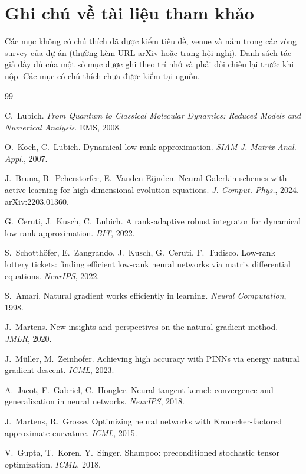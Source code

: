 \section*{Ghi chú về tài liệu tham khảo}
Các mục không có chú thích đã được kiểm tiêu đề, venue và năm trong các vòng survey của dự án (thường kèm URL arXiv hoặc trang hội nghị). Danh sách tác giả đầy đủ của một số mục được ghi theo trí nhớ và phải đối chiếu lại trước khi nộp. Các mục có chú thích chưa được kiểm tại nguồn.

\begin{thebibliography}{99}\small

 C.~Lubich. \emph{From Quantum to Classical Molecular Dynamics: Reduced Models and Numerical Analysis}. EMS, 2008.\unv

 O.~Koch, C.~Lubich. Dynamical low-rank approximation. \emph{SIAM J. Matrix Anal. Appl.}, 2007.\unv

 J.~Bruna, B.~Peherstorfer, E.~Vanden-Eijnden. Neural Galerkin schemes with active learning for high-dimensional evolution equations. \emph{J. Comput. Phys.}, 2024. arXiv:2203.01360.

 G.~Ceruti, J.~Kusch, C.~Lubich. A rank-adaptive robust integrator for dynamical low-rank approximation. \emph{BIT}, 2022.\unv

 S.~Schotthöfer, E.~Zangrando, J.~Kusch, G.~Ceruti, F.~Tudisco. Low-rank lottery tickets: finding efficient low-rank neural networks via matrix differential equations. \emph{NeurIPS}, 2022.

 S.~Amari. Natural gradient works efficiently in learning. \emph{Neural Computation}, 1998.\unv

 J.~Martens. New insights and perspectives on the natural gradient method. \emph{JMLR}, 2020.\unv

 J.~Müller, M.~Zeinhofer. Achieving high accuracy with PINNs via energy natural gradient descent. \emph{ICML}, 2023.

 A.~Jacot, F.~Gabriel, C.~Hongler. Neural tangent kernel: convergence and generalization in neural networks. \emph{NeurIPS}, 2018.\unv

 J.~Martens, R.~Grosse. Optimizing neural networks with Kronecker-factored approximate curvature. \emph{ICML}, 2015.\unv

 V.~Gupta, T.~Koren, Y.~Singer. Shampoo: preconditioned stochastic tensor optimization. \emph{ICML}, 2018.\unv


\end{thebibliography}
